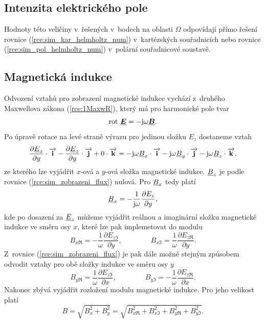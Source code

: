 \subsection*{Intenzita elektrického pole}
Hodnoty této veličiny v~řešených v~bodech na oblasti $\Omega$ odpovídají přímo řešení rovnice (\ref{rce:sim_kar_helmholtz_num}) v~kartézských souřadnicích nebo rovnice (\ref{rce:sim_pol_helmholtz_num}) v~polární souřadnicové soustavě.

\subsection*{Magnetická indukce}
Odvození vztahů pro zobrazení magnetické indukce vychází z~druhého Maxwellova zákona (\ref{rce:1MaxwR}), který má pro harmonické pole tvar
\begin{displaymath}
	\mathrm{rot}\ \mbox{\underline{\boldmath$E$}} = -\mathrm{j}\omega\mbox{\underline{\boldmath$B$}}.
\end{displaymath}
Po úpravě rotace na levé straně výrazu pro jedinou složku $E_z$ dostaneme vztah
\begin{equation}
	\frac{\partial {\underline{E}}_z}{\partial y}\cdot\overrightarrow{\mathrm{\textbf{i}}} - \frac{\partial {\underline{E}}_z}{\partial y}\cdot\overrightarrow{\mathrm{\textbf{j}}} + 0\cdot\overrightarrow{\mathrm{\textbf{k}}} = -\mathrm{j}\omega {\underline{B}}_x\cdot\overrightarrow{\mathrm{\textbf{i}}} - \mathrm{j}\omega{\underline{B}}_y\cdot\overrightarrow{\mathrm{\textbf{j}}} - \mathrm{j}\omega{\underline{B}}_z\cdot\overrightarrow{\mathrm{\textbf{k}}},
	\label{rce:sim_zobrazeni_flux}
\end{equation}
ze kterého lze vyjádřit $x$-ová a $y$-ová složka magnetické indukce. ${\underline{B}}_z$ je podle rovnice (\ref{rce:sim_zobrazeni_flux}) nulová. Pro ${\underline{B}}_x$ tedy platí
\begin{displaymath}
	{\underline{B}}_x = -\frac{1}{\mathrm{j}\omega}\frac{\partial E_z}{\partial y},
\end{displaymath}
kde po dosazení za ${\underline{E}}_z$ můžeme vyjádřit reálnou a imaginární složku magnetické indukce ve směru osy $x$, které lze pak implemetovat do modulu
\begin{equation}
	B_{x\Re} = -\frac{1}{\omega}\frac{\partial E_{z\Im}}{\partial y}, \qquad \qquad B_{x\Im} = \frac{1}{\omega}\frac{\partial E_{z\Re}}{\partial y}.
	\label{rce:sim_flux_x_re}
\end{equation}
Z~rovnice (\ref{rce:sim_zobrazeni_flux}) je pak dále možné stejným způsobem odvodit vztahy pro obě složky indukce ve směru osy $y$
\begin{equation}
	B_{y\Re} = \frac{1}{\omega}\frac{\partial E_{z\Im}}{\partial x}, \qquad \qquad B_{y\Im} = -\frac{1}{\omega}\frac{\partial E_{z\Re}}{\partial x}.
	\label{rce:sim_flux_y_im}
\end{equation}
Nakonec zbývá vyjádřit rozložení modulu magnetické indukce. Pro jeho velikost platí
\begin{displaymath}
	B = \sqrt{B_{x}^{2} + B_{y}^{2}} = \sqrt{B_{x\Re}^{2} + B_{x\Im}^{2} + B_{y\Re}^{2} + B_{y\Im}^{2}}.
\end{displaymath}

